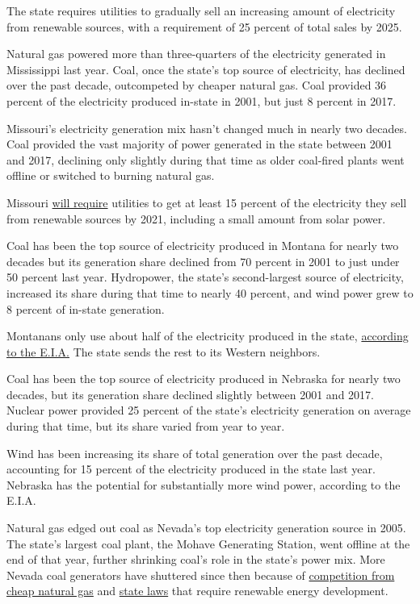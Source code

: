 The state requires utilities to gradually sell an increasing amount of
electricity from renewable sources, with a requirement of 25 percent of
total sales by 2025.

Natural gas powered more than three-quarters of the electricity
generated in Mississippi last year. Coal, once the state's top source of
electricity, has declined over the past decade, outcompeted by cheaper
natural gas. Coal provided 36 percent of the electricity produced
in-state in 2001, but just 8 percent in 2017.

Missouri's electricity generation mix hasn't changed much in nearly two
decades. Coal provided the vast majority of power generated in the state
between 2001 and 2017, declining only slightly during that time as older
coal-fired plants went offline or switched to burning natural gas.

Missouri
\href{http://programs.dsireusa.org/system/program/detail/2622}{will
require} utilities to get at least 15 percent of the electricity they
sell from renewable sources by 2021, including a small amount from solar
power.

Coal has been the top source of electricity produced in Montana for
nearly two decades but its generation share declined from 70 percent in
2001 to just under 50 percent last year. Hydropower, the state's
second-largest source of electricity, increased its share during that
time to nearly 40 percent, and wind power grew to 8 percent of in-state
generation.

Montanans only use about half of the electricity produced in the state,
\href{https://www.eia.gov/state/analysis.php?sid=MT}{according to the
E.I.A.} The state sends the rest to its Western neighbors.

Coal has been the top source of electricity produced in Nebraska for
nearly two decades, but its generation share declined slightly between
2001 and 2017. Nuclear power provided 25 percent of the state's
electricity generation on average during that time, but its share varied
from year to year.

Wind has been increasing its share of total generation over the past
decade, accounting for 15 percent of the electricity produced in the
state last year. Nebraska has the potential for substantially more wind
power, according to the E.I.A.

Natural gas edged out coal as Nevada's top electricity generation source
in 2005. The state's largest coal plant, the Mohave Generating Station,
went offline at the end of that year, further shrinking coal's role in
the state's power mix. More Nevada coal generators have shuttered since
then because of
\href{https://www.omaha.com/money/buffett/nv-energy-s-move-away-from-coal-mirrors-other-utilities/article_ee1390c5-def4-54e3-af46-9f15add993b1.html}{competition
from cheap natural gas} and
\href{https://lasvegassun.com/news/2013/jun/04/nv-energy-bill-wins-passage-signaling-shift-coal/}{state
laws} that require renewable energy development.

